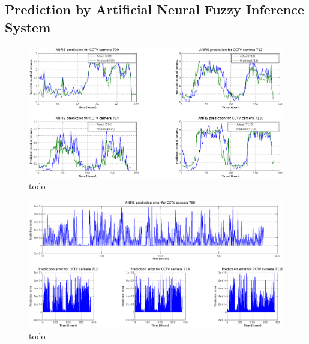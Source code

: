 \subsection{Prediction by Artificial Neural Fuzzy Inference System}

\begin{figure}
\centering
\includegraphics[width=\textwidth]{Figures/Figure_Prediction.png}
 \caption{todo}
\end{figure}

\begin{figure}
\centering
\includegraphics[width=\textwidth]{Figures/Figure_PredictionError.png}
 \caption{todo}
\end{figure}

